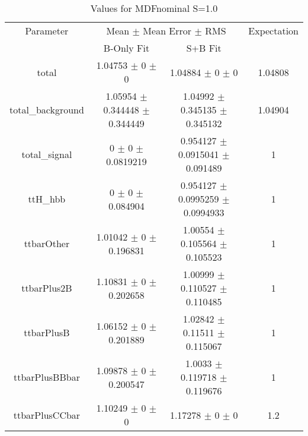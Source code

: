 \begin{table}
\centering
\caption{Values for MDFnominal S=1.0}
\begin{tabular}{cccc}
\toprule
Parameter & \multicolumn{2}{c}{Mean $\pm$ Mean Error $\pm$ RMS} & Expectation\\
 & B-Only Fit & S+B Fit & \\
\midrule
total & \num{1.04753} $\pm$ \num{0} $\pm$ \num{0} & \num{1.04884} $\pm$ \num{0} $\pm$ \num{0} & \num{1.04808}\\
total\_background & \num{1.05954} $\pm$ \num{0.344448} $\pm$ \num{0.344449} & \num{1.04992} $\pm$ \num{0.345135} $\pm$ \num{0.345132} & \num{1.04904}\\
total\_signal & \num{0} $\pm$ \num{0} $\pm$ \num{0.0819219} & \num{0.954127} $\pm$ \num{0.0915041} $\pm$ \num{0.091489} & \num{1}\\
ttH\_hbb & \num{0} $\pm$ \num{0} $\pm$ \num{0.084904} & \num{0.954127} $\pm$ \num{0.0995259} $\pm$ \num{0.0994933} & \num{1}\\
ttbarOther & \num{1.01042} $\pm$ \num{0} $\pm$ \num{0.196831} & \num{1.00554} $\pm$ \num{0.105564} $\pm$ \num{0.105523} & \num{1}\\
ttbarPlus2B & \num{1.10831} $\pm$ \num{0} $\pm$ \num{0.202658} & \num{1.00999} $\pm$ \num{0.110527} $\pm$ \num{0.110485} & \num{1}\\
ttbarPlusB & \num{1.06152} $\pm$ \num{0} $\pm$ \num{0.201889} & \num{1.02842} $\pm$ \num{0.11511} $\pm$ \num{0.115067} & \num{1}\\
ttbarPlusBBbar & \num{1.09878} $\pm$ \num{0} $\pm$ \num{0.200547} & \num{1.0033} $\pm$ \num{0.119718} $\pm$ \num{0.119676} & \num{1}\\
ttbarPlusCCbar & \num{1.10249} $\pm$ \num{0} $\pm$ \num{0} & \num{1.17278} $\pm$ \num{0} $\pm$ \num{0} & \num{1.2}\\
\bottomrule
\end{tabular}
\end{table}